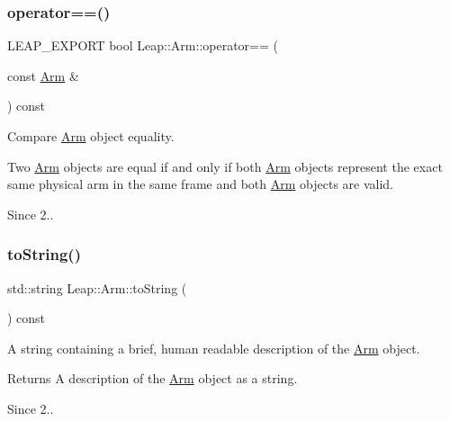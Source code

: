 \subsubsection{\texorpdfstring{operator==()}{operator==()}}
{\footnotesize\ttfamily L\+E\+A\+P\+\_\+\+E\+X\+P\+O\+RT bool Leap\+::\+Arm\+::operator== (\begin{DoxyParamCaption}\item[{const \hyperlink{class_leap_1_1_arm}{Arm} \&}]{ }\end{DoxyParamCaption}) const}

Compare \hyperlink{class_leap_1_1_arm}{Arm} object equality.


\begin{DoxyCodeInclude}
\end{DoxyCodeInclude}


Two \hyperlink{class_leap_1_1_arm}{Arm} objects are equal if and only if both \hyperlink{class_leap_1_1_arm}{Arm} objects represent the exact same physical arm in the same frame and both \hyperlink{class_leap_1_1_arm}{Arm} objects are valid. \begin{DoxySince}{Since}
2.. 
\end{DoxySince}
\mbox{\label{class_leap_1_1_arm_ac8cab698eef881e338b63d713baaccbb}} 
\subsubsection{\texorpdfstring{to\+String()}{toString()}}
{\footnotesize\ttfamily std\+::string Leap\+::\+Arm\+::to\+String (\begin{DoxyParamCaption}{ }\end{DoxyParamCaption}) const\hspace{0.3cm}{\ttfamily [inline]}}

A string containing a brief, human readable description of the \hyperlink{class_leap_1_1_arm}{Arm} object.


\begin{DoxyCodeInclude}
\end{DoxyCodeInclude}


\begin{DoxyReturn}{Returns}
A description of the \hyperlink{class_leap_1_1_arm}{Arm} object as a string. 
\end{DoxyReturn}
\begin{DoxySince}{Since}
2.. 
\end{DoxySince}
\mbox{\label{class_leap_1_1_arm_a7a45202de177e3f6f8c1b5847465993a}} 
